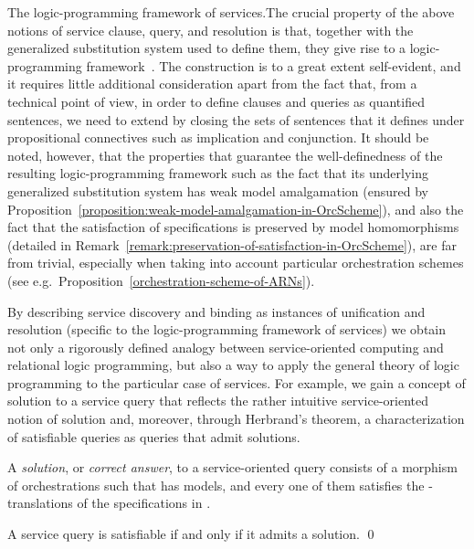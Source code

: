 \documentclass{LMCS}
\begin{document}
  \begin{minisection}{The logic-programming framework of services.}The crucial property of the above notions of service clause, query, and resolution is that, together with the generalized substitution system  used to define them, they give rise to a logic-programming framework~\cite{Tutu-Fiadeiro:Institution-independent-logic-programming-2015}.
    The construction is to a great extent self-evident, and it requires little additional consideration apart from the fact that, from a technical point of view, in order to define clauses and queries as quantified sentences, we need to extend  by closing the sets of sentences that it defines under propositional connectives such as implication and conjunction.
    It should be noted, however, that the properties that guarantee the well-definedness of the resulting logic-programming framework such as the fact that its underlying generalized substitution system has weak model amalgamation (ensured by Proposition~\ref{proposition:weak-model-amalgamation-in-OrcScheme}), and also the fact that the satisfaction of specifications is preserved by model homomorphisms (detailed in Remark~\ref{remark:preservation-of-satisfaction-in-OrcScheme}), are far from trivial, especially when taking into account particular orchestration schemes (see e.g.\ Proposition~\ref{orchestration-scheme-of-ARNs}).
\end{minisection}

  By describing service discovery and binding as instances of unification and resolution (specific to the logic-programming framework of services) we obtain not only a rigorously defined analogy between service-oriented computing and relational logic programming, but also a way to apply the general theory of logic programming to the particular case of services.
  For example, we gain a concept of solution to a service query that reflects the rather intuitive service-oriented notion of solution and, moreover, through Herbrand's theorem, a characterization of satisfiable queries as queries that admit solutions.

  \begin{defi}[Solution]
    A \emph{solution}, or \emph{correct answer}, to a service-oriented query  consists of a morphism of orchestrations  such that  has models, and every one of them satisfies the \nb-translations of the specifications in .
  \end{defi}

  \begin{prop}
    \label{proposition:characterization-of-satisfiable-service-queries}
    A service query is satisfiable if and only if it admits a solution.
    \qed
  \end{prop}
\end{document}
